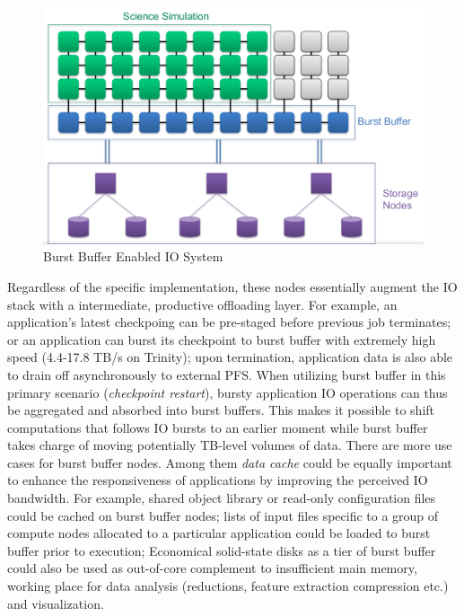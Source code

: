 \begin{figure}[!t]
        \centering
        \includegraphics[width=6.6in]{BBArchitecture}
        \caption{Burst Buffer Enabled IO System}
        \label{Fig:BBArchitecture}
\end{figure}

Regardless of the specific implementation, these nodes essentially augment
the IO stack with a intermediate, productive offloading layer.
For example, an application's latest checkpoing can be pre-staged
before previous job terminates;
or an application can burst its checkpoint to burst buffer
with extremely high speed (4.4-17.8 TB/s on Trinity);
upon termination, application data is also able to drain off
asynchronously to external PFS.
When utilizing burst buffer in this primary scenario (\textit{checkpoint restart}),
bursty application IO operations can thus be aggregated and absorbed into burst buffers.
This makes it possible to shift computations that follows IO bursts to an earlier moment
while burst buffer takes charge of moving potentially TB-level volumes of data.
There are more use cases for burst buffer nodes.
Among them \textit{data cache} could be equally important to enhance the responsiveness
of applications by improving the perceived IO bandwidth\cite{BBUseCase}.
For example, shared object library or read-only configuration files could be
cached on burst buffer nodes;
lists of input files specific to a group of compute nodes allocated to
a particular application could be loaded to burst buffer prior to execution;
Economical solid-state disks as a tier of burst buffer could also be used as
out-of-core complement to insufficient main memory\cite{Romanus:CORR:15},
working place for data analysis (reductions, feature extraction compression etc.)
and visualization\cite{BBUseCase}.

